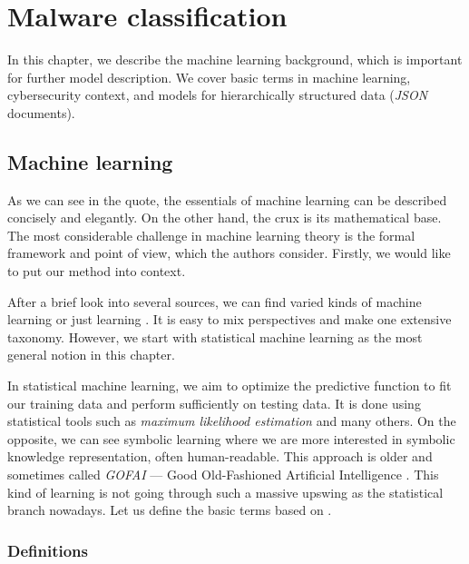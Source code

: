 \chapter{Malware classification} \label{chap:classification}
In this chapter, we describe the machine learning background, which is important for further model description. We cover basic terms in machine learning, cybersecurity context, and models for hierarchically structured data (\emph{JSON} documents).

\section{Machine learning}
 \cite{Russell2009}

As we can see in the quote, the essentials of machine learning can be described concisely and elegantly. On the other hand, the crux is its mathematical base. The most considerable challenge in machine learning theory is the formal framework and point of view, which the authors consider. Firstly, we would like to put our method into context.

After a brief look into several sources, we can find varied kinds of machine learning or just learning \cite{Russell2009}. It is easy to mix perspectives and make one extensive taxonomy. However, we start with statistical machine learning as the most general notion in this chapter. 

In statistical machine learning, we aim to optimize the predictive function to fit our training data and perform sufficiently on testing data. It is done using statistical tools such as \emph{maximum likelihood estimation} and many others. On the opposite, we can see symbolic learning where we are more interested in symbolic knowledge representation, often human-readable. This approach is older and sometimes called \emph{GOFAI} --- Good Old-Fashioned Artificial Intelligence \cite{Haugeland1985}. This kind of learning is not going through such a massive upswing as the statistical branch nowadays. Let us define the basic terms based on \cite{Franc2020}.

\subsection{Definitions}
